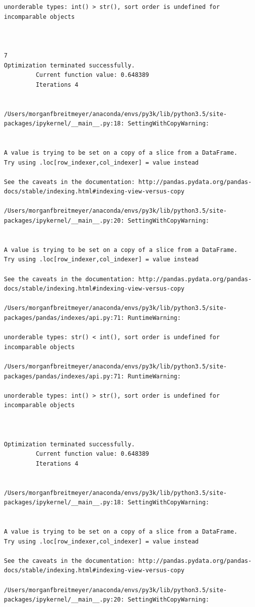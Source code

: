 \begin{lstlisting}
unorderable types: int() > str(), sort order is undefined for incomparable objects



7
Optimization terminated successfully.
         Current function value: 0.648389
         Iterations 4


/Users/morganfbreitmeyer/anaconda/envs/py3k/lib/python3.5/site-packages/ipykernel/__main__.py:18: SettingWithCopyWarning:


A value is trying to be set on a copy of a slice from a DataFrame.
Try using .loc[row_indexer,col_indexer] = value instead

See the caveats in the documentation: http://pandas.pydata.org/pandas-docs/stable/indexing.html#indexing-view-versus-copy

/Users/morganfbreitmeyer/anaconda/envs/py3k/lib/python3.5/site-packages/ipykernel/__main__.py:20: SettingWithCopyWarning:


A value is trying to be set on a copy of a slice from a DataFrame.
Try using .loc[row_indexer,col_indexer] = value instead

See the caveats in the documentation: http://pandas.pydata.org/pandas-docs/stable/indexing.html#indexing-view-versus-copy

/Users/morganfbreitmeyer/anaconda/envs/py3k/lib/python3.5/site-packages/pandas/indexes/api.py:71: RuntimeWarning:

unorderable types: str() < int(), sort order is undefined for incomparable objects

/Users/morganfbreitmeyer/anaconda/envs/py3k/lib/python3.5/site-packages/pandas/indexes/api.py:71: RuntimeWarning:

unorderable types: int() > str(), sort order is undefined for incomparable objects



Optimization terminated successfully.
         Current function value: 0.648389
         Iterations 4


/Users/morganfbreitmeyer/anaconda/envs/py3k/lib/python3.5/site-packages/ipykernel/__main__.py:18: SettingWithCopyWarning:


A value is trying to be set on a copy of a slice from a DataFrame.
Try using .loc[row_indexer,col_indexer] = value instead

See the caveats in the documentation: http://pandas.pydata.org/pandas-docs/stable/indexing.html#indexing-view-versus-copy

/Users/morganfbreitmeyer/anaconda/envs/py3k/lib/python3.5/site-packages/ipykernel/__main__.py:20: SettingWithCopyWarning:



\end{lstlisting}
